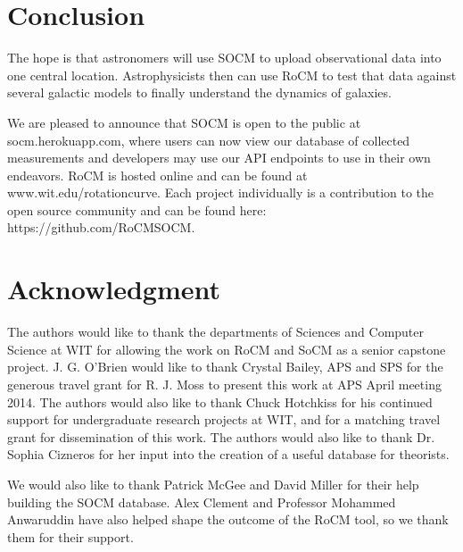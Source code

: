 \documentclass[conference]{IEEEtran-modified}
\begin{document}
\newpage

\section{Conclusion}
The hope is that astronomers will use SOCM to upload observational data into one central location. Astrophysicists then can use RoCM to test that data against several galactic models to finally understand the dynamics of galaxies. 

	 We are pleased to announce that SOCM is open to the public at socm.herokuapp.com, where users can now view our database of collected measurements and developers may use our API endpoints to use in their own endeavors. RoCM is hosted online and can be found at www.wit.edu/rotationcurve. Each project individually is a contribution to the open source community and can be found here: https://github.com/RoCMSOCM.



\section*{Acknowledgment}

The authors would like to thank the departments of Sciences and Computer Science at WIT for allowing the work on RoCM and SoCM as a senior capstone project. J. G. O'Brien would like to thank Crystal Bailey, APS and SPS for the generous travel grant for R. J. Moss to present this work at APS April meeting 2014. The authors would also like to thank Chuck Hotchkiss for his continued support for undergraduate research projects at WIT, and for a matching travel grant for dissemination of this work. The authors would also like to thank Dr. Sophia Cizneros for her input into the creation of a useful database for theorists.

We would also like to thank Patrick McGee and David Miller for their help building the SOCM database. Alex Clement and Professor Mohammed Anwaruddin have also helped shape the outcome of the RoCM tool, so we thank them for their support.





\end{document}

